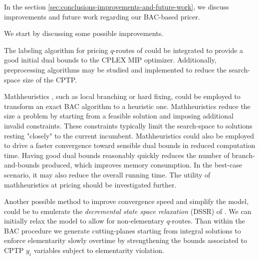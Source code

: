 In the section \cref{sec:conclusions-improvements-and-future-work},
we discuss improvements and future work regarding our BAC-based pricer.

We start by discussing some possible improvements.

The labeling algorithm for pricing $q$-routes of \textcite{desrochers1992} could be integrated
to provide a good initial dual bounds to the CPLEX MIP optimizer.
Additionally, preprocessing algorithms may be studied and implemented to reduce
the search-space size of the CPTP.

Mathheuristics \parencite{fischetti2018},
such as local branching \parencite{fischetti2003} or hard fixing,
could be employed to transform an exact BAC algorithm to a heuristic one.
Mathheuristics reduce the size a problem
by starting from a feasible solution and imposing additional invalid constraints.
These constraints typically limit the search-space to
solutions resting "closely" to the current incumbent.
Mathheuristics could also be employed to drive a faster convergence
toward sensible dual bounds in reduced computation time.
Having good dual bounds reasonably quickly reduces the number of branch-and-bounds produced,
which improves memory consumption.
In the best-case scenario, it may also reduce the overall running time.
The utility of mathheuristics at pricing should be investigated further.

Another possible method to improve convergence speed and simplify
the model, could be to emulerate the \textit{decremental state space relaxation} (DSSR)
of \textcite{boland2006, righini2008, martinelli2014}.
We can initially relax the model to allow for non-elementary $q$-routes.
Than within the BAC procedure we generate cutting-planes starting from integral solutions
to enforce elementarity slowly overtime by strengthening the bounds associated
to CPTP $y_i$ variables subject to elementarity violation.

